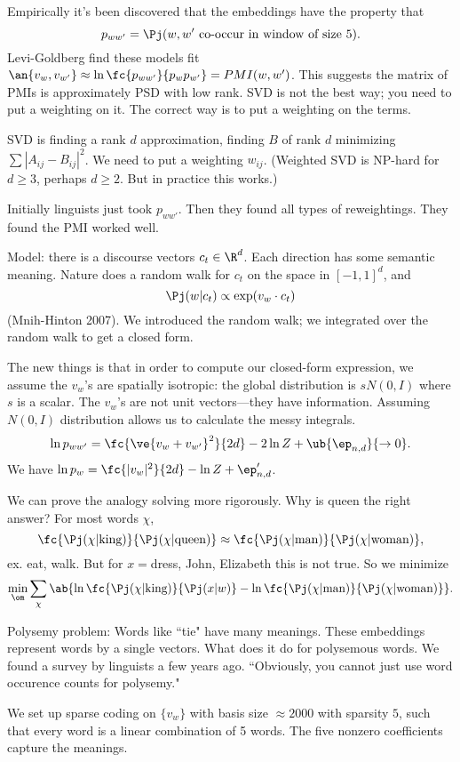 Empirically it's been discovered that the embeddings have the property that 
\[
p_{ww'} = \Pj(w,w'\text{ co-occur in window of size 5}).
\]
Levi-Goldberg find these models fit $\an{v_w,v_{w'}} \approx \ln \fc{p_{ww'}}{p_wp_{w'}}=PMI(w,w')$. This suggests the matrix of PMIs is approximately PSD with low rank. SVD is not the best way; you need to put a weighting on it. 
The correct way is to put a weighting on the terms.

SVD is finding a rank $d$ approximation, finding $B$ of rank $d$ minimizing $\sum |A_{ij}-B_{ij}|^2$. We need to put a weighting $w_{ij}$. (Weighted SVD is NP-hard for $d\ge 3$, perhaps $d\ge 2$. But in practice this works.)

Initially linguists just took $p_{ww'}$. Then they found all types of reweightings. They found the PMI worked well. %

Model: there is a discourse vectors $c_t\in \R^d$. Each direction has some semantic meaning. Nature does a random walk for $c_t$ on the space in $[-1,1]^d$, and
\[
\Pj(w|c_t)\propto \exp(v_w\cdot c_t)
\]
(Mnih-Hinton 2007). We introduced the random walk; we integrated over the random walk to get a closed form.

The new things is that in order to compute our closed-form expression, we assume the $v_w$'s are spatially isotropic: the global distribution is $sN(0,I)$ where $s$ is a scalar. The $v_w$'s are not unit vectors---they have information. Assuming $N(0,I)$ distribution allows us to calculate the messy integrals.
\[
\ln p_{ww'}=\fc{\ve{v_w+v_{w'}}^2}{2d}-2\ln Z+\ub{\ep_{n,d}}{\to 0}.
\]
We have $\ln p_w = \fc{|v_w|^2}{2d}-\ln Z+\ep'_{n,d}$. %

We can prove the analogy solving more rigorously. Why is queen the right answer? For most words $\chi$,
\[
\fc{\Pj(\chi|\text{king})}{\Pj(\chi|\text{queen})} \approx \fc{\Pj(\chi|\text{man})}{\Pj(\chi|\text{woman})},
\]
ex. eat, walk. But for $x=$dress, John, Elizabeth this is not true. So we minimize 
\[
\min_\om \sum_{\chi} \ab{
\ln \fc{\Pj(\chi|\text{king})}{\Pj(x|w)}- \ln \fc{\Pj(\chi|\text{man})}{\Pj(\chi|\text{woman})}
}.
\]

Polysemy problem: Words like ``tie" have many meanings. These embeddings represent words by a single vectors. What does it do for polysemous words. 
We found a survey by linguists a few years ago. ``Obviously, you cannot just use word occurence counts for polysemy."

We set up sparse coding on $\{v_w\}$ with basis size $\approx 2000$ with sparsity $5$, such that every word is a linear combination of 5 words. The five nonzero coefficients capture the meanings.

